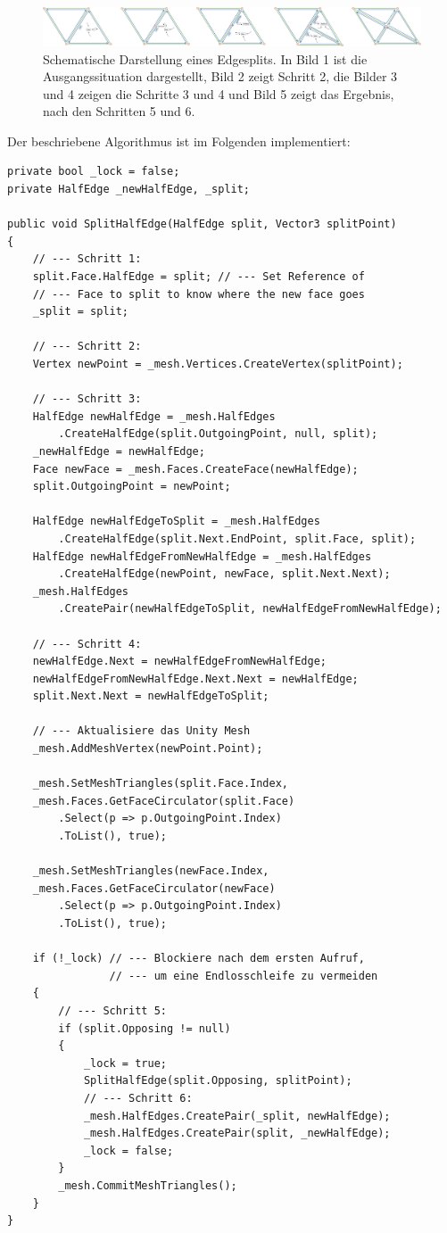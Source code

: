 \begin{figure}[H]
	\centering
	\includegraphics[width=1\linewidth]{Images/splitHalfEdge}
	\caption{Schematische Darstellung eines Edgesplits. In Bild 1 ist die Ausgangssituation dargestellt, Bild 2 zeigt Schritt 2, die Bilder 3 und 4 zeigen die Schritte 3 und 4 und Bild 5 zeigt das Ergebnis, nach den Schritten 5 und 6.}
	\label{fig:splithalfedge}
\end{figure}


Der beschriebene Algorithmus ist im Folgenden implementiert:
\begin{lstlisting}
private bool _lock = false;
private HalfEdge _newHalfEdge, _split;

public void SplitHalfEdge(HalfEdge split, Vector3 splitPoint)
{
	// --- Schritt 1:
	split.Face.HalfEdge = split; // --- Set Reference of 
	// --- Face to split to know where the new face goes
	_split = split;

	// --- Schritt 2:
	Vertex newPoint = _mesh.Vertices.CreateVertex(splitPoint);

	// --- Schritt 3:
	HalfEdge newHalfEdge = _mesh.HalfEdges
		.CreateHalfEdge(split.OutgoingPoint, null, split);
	_newHalfEdge = newHalfEdge;
	Face newFace = _mesh.Faces.CreateFace(newHalfEdge);
	split.OutgoingPoint = newPoint;

	HalfEdge newHalfEdgeToSplit = _mesh.HalfEdges
		.CreateHalfEdge(split.Next.EndPoint, split.Face, split);
	HalfEdge newHalfEdgeFromNewHalfEdge = _mesh.HalfEdges
		.CreateHalfEdge(newPoint, newFace, split.Next.Next);
	_mesh.HalfEdges
		.CreatePair(newHalfEdgeToSplit, newHalfEdgeFromNewHalfEdge);

	// --- Schritt 4:
	newHalfEdge.Next = newHalfEdgeFromNewHalfEdge;
	newHalfEdgeFromNewHalfEdge.Next.Next = newHalfEdge;
	split.Next.Next = newHalfEdgeToSplit;

	// --- Aktualisiere das Unity Mesh
	_mesh.AddMeshVertex(newPoint.Point);
	
	_mesh.SetMeshTriangles(split.Face.Index,
	_mesh.Faces.GetFaceCirculator(split.Face)
		.Select(p => p.OutgoingPoint.Index)
		.ToList(), true);
	 
	_mesh.SetMeshTriangles(newFace.Index,
	_mesh.Faces.GetFaceCirculator(newFace)
		.Select(p => p.OutgoingPoint.Index)
		.ToList(), true);
	
	if (!_lock) // --- Blockiere nach dem ersten Aufruf,
				// --- um eine Endlosschleife zu vermeiden
	{
		// --- Schritt 5:
		if (split.Opposing != null) 
		{
			_lock = true;
			SplitHalfEdge(split.Opposing, splitPoint);
			// --- Schritt 6:
			_mesh.HalfEdges.CreatePair(_split, newHalfEdge);
			_mesh.HalfEdges.CreatePair(split, _newHalfEdge);
			_lock = false;
		}
		_mesh.CommitMeshTriangles();
	}
}
\end{lstlisting}
